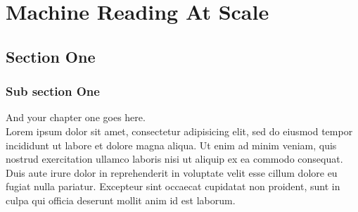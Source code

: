 \chapter{Machine Reading At Scale}%
\label{chap:chap4}

\section{Section One}
\label{section:chap4:sec1}

  \subsection{Sub section One}
  And your chapter one goes here\@. ~\\
  Lorem ipsum dolor sit amet, consectetur adipisicing elit, sed do eiusmod
  tempor incididunt ut labore et dolore magna aliqua. Ut enim ad minim veniam,
  quis nostrud exercitation ullamco laboris nisi ut aliquip ex ea commodo
  consequat. Duis aute irure dolor in reprehenderit in voluptate velit esse
  cillum dolore eu fugiat nulla pariatur. Excepteur sint occaecat cupidatat non
  proident, sunt in culpa qui officia deserunt mollit anim id est laborum.


